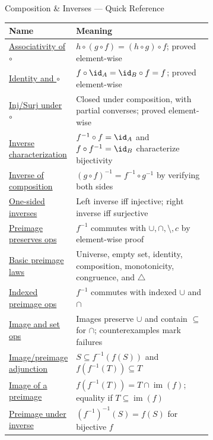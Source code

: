 \begin{toolkitbox}{Composition \& Inverses --- Quick Reference}
\small
\begin{tabular}{l p{0.68\linewidth}}
\toprule
\textbf{Name}  & \textbf{Meaning} \\
\midrule
\hyperref[thm:comp-assoc]{Associativity of $\circ$}  & $h \circ (g \circ f) = (h \circ g) \circ f$; proved element-wise \\
\hyperref[thm:comp-id]{Identity and $\circ$}      & $f \circ \id_A = \id_B \circ f = f$; proved element-wise \\
\hyperref[thm:comp-inj-surj]{Inj/Surj under $\circ$}    & Closed under composition, with partial converses; proved element-wise \\
\hyperref[thm:inverse-char]{Inverse characterization}  & $f^{-1}\circ f = \id_A$ and $f \circ f^{-1} = \id_B$ characterize bijectivity \\
\hyperref[thm:inverse-comp]{Inverse of composition}    & $(g \circ f)^{-1} = f^{-1} \circ g^{-1}$ by verifying both sides \\
\hyperref[thm:one-sided]{One-sided inverses}        & Left inverse iff injective; right inverse iff surjective \\
\hyperref[thm:preimage-ops]{Preimage preserves ops}    & $f^{-1}$ commutes with $\cup,\cap,\setminus,c$ by element-wise proof \\
\hyperref[thm:basic-preimage-laws]{Basic preimage laws} & Universe, empty set, identity, composition, monotonicity, congruence, and $\triangle$ \\
\hyperref[thm:indexed-preimage-ops]{Indexed preimage ops} & $f^{-1}$ commutes with indexed $\cup$ and $\cap$ \\
\hyperref[thm:image-ops]{Image and set ops}         & Images preserve $\cup$ and contain $\subseteq$ for $\cap$; counterexamples mark failures \\
\hyperref[thm:image-preimage-adjunction]{Image/preimage adjunction}  & $S\subseteq f^{-1}(f(S))$ and $f(f^{-1}(T))\subseteq T$ \\
\hyperref[thm:image-of-preimage]{Image of a preimage} & $f(f^{-1}(T))=T\cap\operatorname{im}(f)$; equality if $T\subseteq\operatorname{im}(f)$ \\
\hyperref[prop:preimage-under-inverse-function]{Preimage under inverse} & $(f^{-1})^{-1}(S)=f(S)$ for bijective $f$ \\
\bottomrule
\end{tabular}
\end{toolkitbox}


